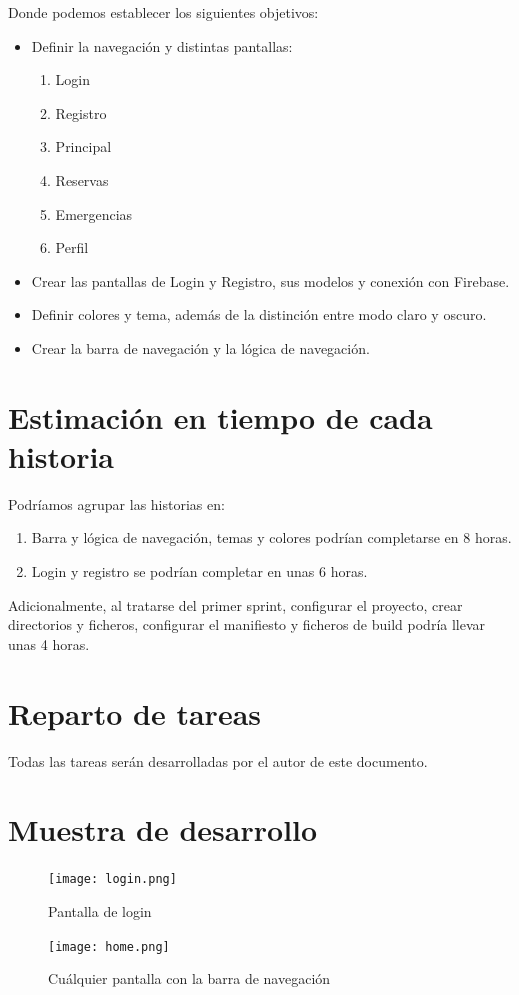 \documentclass{article}
\begin{document}
    Donde podemos establecer los siguientes objetivos:

    \begin{itemize}
        \item Definir la navegación y distintas pantallas:
        \begin{enumerate}
            \item Login
            \item Registro
            \item Principal
            \item Reservas
            \item Emergencias
            \item Perfil
        \end{enumerate}
        \item Crear las pantallas de Login y Registro, sus modelos y conexión con Firebase.
        \item Definir colores y tema, además de la distinción entre modo claro y oscuro.
        \item Crear la barra de navegación y la lógica de navegación.
    \end{itemize}

    \section{Estimación en tiempo de cada historia}

    Podríamos agrupar las historias en:

    \begin{enumerate}
        \item Barra y lógica de navegación, temas y colores podrían completarse en 8 horas.
        \item Login y registro se podrían completar en unas 6 horas.
    \end{enumerate}

    Adicionalmente, al tratarse del primer sprint, configurar el proyecto, crear directorios y
     ficheros, configurar el manifiesto y ficheros de build podría llevar unas 4 horas.

    \section{Reparto de tareas}

    Todas las tareas serán desarrolladas por el autor de este documento.

    \section{Muestra de desarrollo}
    
    \begin{figure}[H]
        \centerline{\texttt{[image: login.png]}}
        \caption{Pantalla de login}
        \label{fig:login}
    \end{figure}

    \begin{figure}[H]
        \centerline{\texttt{[image: home.png]}}
        \caption{Cuálquier pantalla con la barra de navegación}
        \label{fig:home}
    \end{figure}
\end{document}
